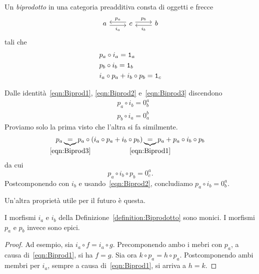\begin{definition}\label{definition:Biprodotto}
  Un {\em biprodotto} in una categoria preadditiva consta di oggetti e frecce
  \[
    \begin{tikzcd}
      a \ar["{i_a}", r, shift right, swap] & c \ar["{p_a}", l, shift
      right, swap] \ar["{p_b}", r, shift left] & b \ar["{i_b}", l,
      shift left]
    \end{tikzcd}
  \]
  tali che
  \begin{align}
    & p_a \circ i_a = \mathtt 1_a \label{eqn:Biprod1} \\
    & p_b \circ i_b = \mathtt 1_b \label{eqn:Biprod2}\\
    & i_a \circ p_a + i_b \circ p_b = \mathtt 1_c \label{eqn:Biprod3}
  \end{align}
\end{definition}

\begin{remark}
  Dalle identità~\ref{eqn:Biprod1}, \ref{eqn:Biprod2}
  e~\ref{eqn:Biprod3} discendono
  \begin{align}
    & p_a \circ i_b = 0_b^a \label{eqn:Biprod4} \\
    & p_b \circ i_a = 0_a^b \label{eqn:Biprod5}
  \end{align}
  Proviamo solo la prima visto che l'altra si fa similmente.
  \[
    p_a \underbrace{=}_{\mathclap{\eqref{eqn:Biprod3}}} p_a \circ \left(
      i_a \circ p_a + i_b \circ p_b \right)
    \underbrace{=}_{\mathclap{\eqref{eqn:Biprod1}}} p_a + p_a \circ i_b
    \circ p_b
  \]
  da cui
  \[
    p_a \circ i_b \circ p_b = 0_c^a .
  \]
  Postcomponendo con \(i_b\) e usando~\eqref{eqn:Biprod2}, concludiamo
  \(p_a \circ i_b = 0_b^a\).
\end{remark}

Un'altra proprietà utile per il futuro è questa.

\begin{proposition}
  I morfismi \(i_a\) e \(i_b\) della
  Definizione~\ref{definition:Biprodotto} sono monici. I morfismi
  \(p_a\) e \(p_b\) invece sono epici.
\end{proposition}

\begin{proof}
  Ad esempio, sia \(i_a \circ f = i_a \circ g\). Precomponendo ambo i
  mebri con \(p_a\), a causa di~\eqref{eqn:Biprod1}, si ha \(f =
  g\). Sia ora \(k \circ p_a = h \circ p_a\). Postcomponendo ambi membri
  per \(i_a\), sempre a causa di~\eqref{eqn:Biprod1}, si arriva a
  \(h = k\).
\end{proof}

